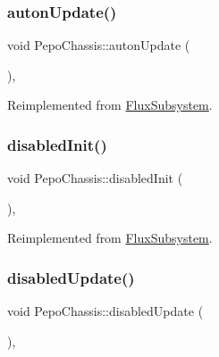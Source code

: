 \subsubsection{\texorpdfstring{auton\+Update()}{autonUpdate()}}
{\footnotesize\ttfamily void Pepo\+Chassis\+::auton\+Update (\begin{DoxyParamCaption}{ }\end{DoxyParamCaption})\hspace{0.3cm}{\ttfamily [override]}, {\ttfamily [virtual]}}



Reimplemented from \hyperlink{classFluxSubsystem_aceed900af22503022b8d1278f3693f77}{Flux\+Subsystem}.

\mbox{\label{classPepoChassis_af5f6848de51ac4c47cbf2f9f706b1485}} 
\subsubsection{\texorpdfstring{disabled\+Init()}{disabledInit()}}
{\footnotesize\ttfamily void Pepo\+Chassis\+::disabled\+Init (\begin{DoxyParamCaption}{ }\end{DoxyParamCaption})\hspace{0.3cm}{\ttfamily [override]}, {\ttfamily [virtual]}}



Reimplemented from \hyperlink{classFluxSubsystem_aa0b8fde8aa5094627d15d24e545e1da4}{Flux\+Subsystem}.

\mbox{\label{classPepoChassis_a33af04df9c2396d6197f3298172763d9}} 
\subsubsection{\texorpdfstring{disabled\+Update()}{disabledUpdate()}}
{\footnotesize\ttfamily void Pepo\+Chassis\+::disabled\+Update (\begin{DoxyParamCaption}{ }\end{DoxyParamCaption})\hspace{0.3cm}{\ttfamily [override]}, {\ttfamily [virtual]}}



